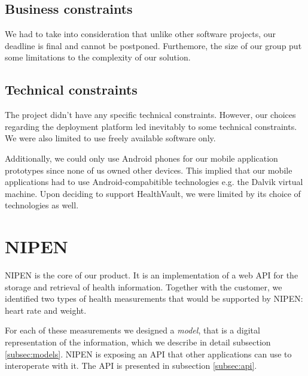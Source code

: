 \subsection{Business constraints}
\label{subsec:business-constraints}

We had to take into consideration that unlike other software projects, our deadline is final
and cannot be postponed. Furthemore, the size of our group put some limitations
to the complexity of our solution.

\subsection{Technical constraints}

The project didn't have any specific technical constraints.
However, our choices regarding the deployment platform led inevitably to some technical
constraints. We were also limited to use freely available software only.


Additionally, we could only use Android phones for our mobile application prototypes
since none of us owned other devices. This implied that our mobile applications
had to use Android-compabitible technologies e.g. the Dalvik virtual machine.
Upon deciding to support HealthVault, we were limited by its choice of
technologies as well.

\section{NIPEN}

NIPEN is the core of our product. 
It is an implementation of a web API for the storage and retrieval of health information.
Together with the customer, we identified two types of health measurements that would be supported by NIPEN: heart rate and weight.

For each of these measurements we designed a \textit{model}, that is a digital representation of the information, which we describe in detail subsection \ref{subsec:models}.
NIPEN is exposing an API that other applications can use to interoperate with it.
The API is presented in subsection \ref{subsec:api}.

